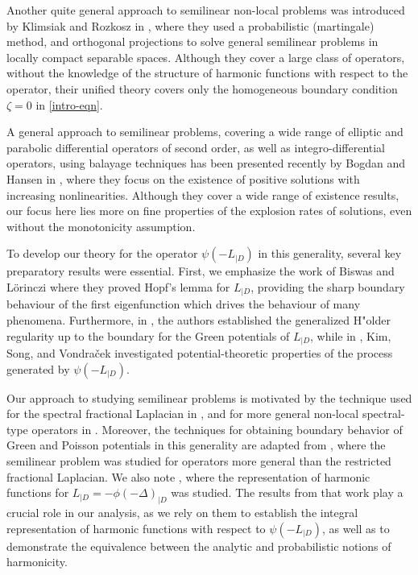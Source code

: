 \documentclass[12pt,a4paper,onecolumn]{article}
\theoremstyle{definition}
\newcommand{\1}{\mathbf 1}
\newcommand{\Lbase}{L_{|D}}
\newcommand{\Lo}{\psi(-L_{|D})}
\numberwithin{equation}{section}
\begin{document}
    Another quite general approach to semilinear non-local problems was introduced by Klimsiak and Rozkosz in \cite{KlimsiakRozkosz25}, where they used a probabilistic (martingale) method, and orthogonal projections to solve general semilinear problems in locally compact separable spaces. Although they cover a large class of operators, without the knowledge of the structure of harmonic functions with respect to the operator, their unified theory covers only the homogeneous boundary condition $\zeta=0$ in \eqref{intro-eqn}.
    
    A general approach to semilinear problems, covering a wide range of elliptic and parabolic differential operators of second order, as well as integro-differential operators, using balayage techniques has been presented recently by Bogdan and Hansen in \cite{BogdanHansen}, where they focus on the existence of positive solutions with increasing nonlinearities. Although they cover a wide range of existence results, our focus here lies more on fine properties of the explosion rates of solutions, even without the monotonicity assumption.

    To develop our theory for the operator $\Lo$ in this generality, several key preparatory results were essential. First, we emphasize the work of Biswas and L\"orinczi \cite{BL-na21} where they proved Hopf's lemma for $\Lbase$, providing the sharp boundary behaviour of the first eigenfunction which drives the behaviour of many phenomena. Furthermore, in \cite{KKLL-jfa19}, the authors established the generalized H"older regularity up to the boundary for the Green potentials of $\Lbase$, while in \cite{ksv_minimal2016}, Kim, Song, and Vondraček investigated potential-theoretic properties of the process generated by $\Lo$.

    Our approach to studying semilinear problems is motivated by the technique used for the spectral fractional Laplacian in \cite{AbaDup-Nonhomog2017}, and for more general non-local spectral-type operators in \cite{Bio23cpaa}. Moreover, the techniques for obtaining boundary behavior of Green and Poisson potentials in this generality are adapted from \cite{BVW-na21}, where the semilinear problem was studied for operators more general than the restricted fractional Laplacian. 
    We also note \cite{Bio21jmaa}, where the representation of harmonic functions for $\Lbase = -\phi(-\Delta)_{|D}$ was studied. The results from that work play a crucial role in our analysis, as we rely on them to establish the integral representation of harmonic functions with respect to $\Lo$, as well as to demonstrate the equivalence between the analytic and probabilistic notions of harmonicity.
\end{document}
